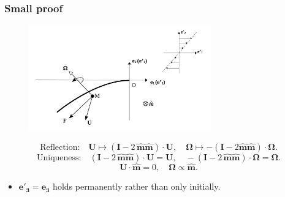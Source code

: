 \documentclass{beamer}
\newcommand{\bi}{\begin{itemize}}
\newcommand{\ei}{\end{itemize}}
\begin{document}
\begin{frame}
	\frametitle{Small proof}
	\begin{overlayarea}{\textwidth}{\textheight}
		\vspace{-0.3cm}	
\begin{figure}[htb]
	\begin{center}
		\includegraphics[width=0.7\textwidth]{plots/relection_general.png}
	\end{center}
\end{figure}
\begin{equation*}
	\text{Reflection:}\quad \mathbf{U}\mapsto(\mathbf{I}-2\,\mathbf{\hat{m}}\mathbf{\hat{m}})\cdot\mathbf{U},\quad 	\bm{\Omega}\mapsto-(\mathbf{I}-2\mathbf{\hat{m}}\mathbf{\hat{m}})\cdot\bm{\Omega}.
\end{equation*}
\begin{equation*}
	\text{Uniqueness:}\quad(\mathbf{I}-2\,\mathbf{\hat{m}}\mathbf{\hat{m}})\cdot\mathbf{U}=\mathbf{U}, \quad 	-(\mathbf{I}-2\,\mathbf{\hat{m}}\mathbf{\hat{m}})\cdot\bm{\Omega}=\bm{\Omega}.
\end{equation*}
\begin{equation*}
	\mathbf{U}\cdot\mathbf{\hat{m}}=0, \quad \bm{\Omega}\varpropto\mathbf{\hat{m}}.
\end{equation*}
\vspace{-0.5cm}	
\bi
\item $\mathbf{e'_3}=\mathbf{e_3}$ holds permanently rather than only initially.
\ei
	\end{overlayarea}
\end{frame}

\end{document}
